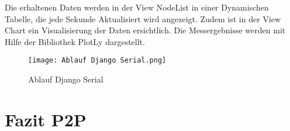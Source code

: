 Die erhaltenen Daten werden in der View Node\textunderscore List in einer Dynamischen Tabelle, die jede Sekunde Aktualisiert wird angezeigt. Zudem ist in der View Chart ein Visualisierung der Daten ersichtlich. Die Messergebnisse werden mit Hilfe der Bibliothek PlotLy dargestellt. \\

\begin{figure} [H]
	\centering
	\texttt{[image: Ablauf Django Serial.png]}
	\caption{Ablauf Django Serial}
	\label{fig:AblaufDjangoSerial}
\end{figure}


\section{Fazit P2P}\label{sec:FazitP2P}

